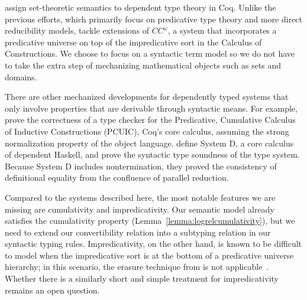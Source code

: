 \documentclass[\ifpublic nolinenum\else\fi,online,OA]{jfp}
\theoremstyle{definition}
\begin{document}
\citet{barras2010sets, Wang2013SemanticsOI} assign
set-theoretic semantics to dependent type theory in Coq. Unlike the
previous efforts, which primarily focus on predicative
type theory and more direct reducibility models,
\citet{barras2010sets, Wang2013SemanticsOI} tackle extensions of
$CC^\omega$, a system that incorporates a predicative universe on top
of the impredicative sort in the Calculus of Constructions. We choose to
focus on a syntactic term model so we do not have to take the extra step
of mechanizing mathematical objects such as sets and domains.

There are other mechanized developments for dependently typed systems that
only involve properties that are derivable through syntactic means. For
example, \citet{coqcoqcorrect2019} prove the correctness of a type checker
for the Predicative, Cumulative Calculus of Inductive Constructions (PCUIC),
Coq's core calculus, assuming the strong normalization property of the object
language. \citet{weirich:systemd} define System D, a core calculus of
dependent Haskell, and prove the syntactic type soundness of the type
system. Because System D includes nontermination, they proved
the consistency of definitional equality from the confluence of 
parallel reduction.  

Compared to the systems described here, the most notable features we are
missing are cumulativity and impredicativity. Our semantic model already
satisfies the cumulativity property (Lemma~\ref{lemma:logrelcumulativity}),
but we need to extend our convertibility relation into a subtyping relation in
our syntactic typing rules. Impredicativity, on the other hand, is known to be
difficult to model when the impredicative sort is at the bottom of a
predicative universe hierarchy; in this scenario, the erasure technique from
\citet{geuvers1994short} is not
applicable~\citep{abel2013normalization}. Whether there is a similarly short
and simple treatment for impredicativity remains an open question.
\end{document}
